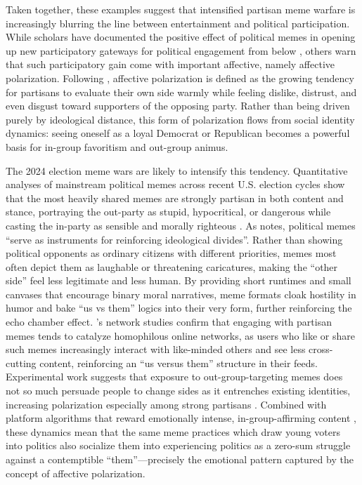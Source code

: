 \documentclass[12pt,twoside]{article}
\begin{document}

Taken together, these examples suggest that intensified partisan meme warfare is increasingly blurring the line between entertainment and political participation. While scholars have documented the positive effect of political memes in opening up new participatory gateways for political engagement from below \parencite{sreekumar2013onlinepoliticalmemes, ahmed2024breakingbarriersmemes, mushtaq2025betweenhumorharm}, others warn that such participatory gain come with important affective, namely affective polarization. Following \textcite{iyengar2012affectnotideology,iyengar2015fearloathing,iyengar2019originsaffectivepolarization}, affective polarization is defined as the growing tendency for partisans to evaluate their own side warmly while feeling dislike, distrust, and even disgust toward supporters of the opposing party. Rather than being driven purely by ideological distance, this form of polarization flows from social identity dynamics: seeing oneself as a loyal Democrat or Republican becomes a powerful basis for in-group favoritism and out-group animus.  

The 2024 election meme wars are likely to intensify this tendency. Quantitative analyses of mainstream political memes across recent U.S. election cycles show that the most heavily shared memes are strongly partisan in both content and stance, portraying the out-party as stupid, hypocritical, or dangerous while casting the in-party as sensible and morally righteous \parencite{collier2024compositionmainstreammemes}. As \textcite{alafnan2025roleMemesPoliticalDiscourse} notes, political memes ``serve as instruments for reinforcing ideological divides''. Rather than showing political opponents as ordinary citizens with different priorities, memes most often depict them as laughable or threatening caricatures, making the “other side” feel less legitimate and less human. By providing short runtimes and small canvases that encourage binary moral narratives, meme formats cloak hostility in humor and bake ``us vs them'' logics into their very form, further reinforcing the echo chamber effect. \textcite{kim2023partisanmemes}'s network studies confirm that engaging with partisan memes tends to catalyze homophilous online networks, as users who like or share such memes increasingly interact with like-minded others and see less cross-cutting content, reinforcing an “us versus them” structure in their feeds. Experimental work suggests that exposure to out-group-targeting memes does not so much persuade people to change sides as it entrenches existing identities, increasing polarization especially among strong partisans \parencite{galipeau2023impactpoliticalmemes}. Combined with platform algorithms that reward emotionally intense, in-group-affirming content \parencite{ye2025auditingexposurebias}, these dynamics mean that the same meme practices which draw young voters into politics also socialize them into experiencing politics as a zero-sum struggle against a contemptible “them”---precisely the emotional pattern captured by the concept of affective polarization.
\end{document}
